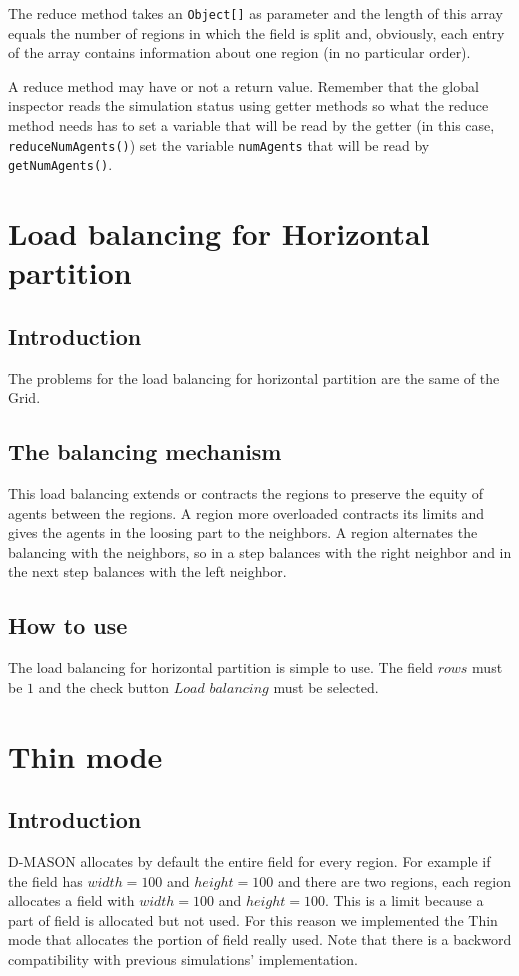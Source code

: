 \documentclass{article}
\begin{document}
The reduce method takes an \texttt{Object[]} as parameter and the length of this array equals the number of regions in which the field is split and, obviously, each entry of the array contains information about one region (in no particular order).

A reduce method may have or not a return value. Remember that the global inspector reads the simulation status using getter methods so what the reduce method needs has to set a variable that will be read by the getter (in this case, \texttt{reduceNumAgents()}) set the variable \texttt{numAgents} that will be read by \texttt{getNumAgents()}.





\section{Load balancing for Horizontal partition}

\subsection{Introduction}
The problems for the load balancing for horizontal partition are the same of the
Grid.

\subsection{The balancing mechanism}
This load balancing extends or contracts the regions to preserve the equity of
agents between the regions. A region more overloaded contracts its limits and
gives the agents in the loosing part to the neighbors. A region alternates the balancing
with the neighbors, so in a step balances with the right neighbor and in the
next step balances with the left neighbor.

\subsection{How to use}
The load balancing for horizontal partition is simple to use. The field $rows$
must be $1$ and the check button $Load$ $balancing$ must be selected.

\section{Thin mode}

\subsection{Introduction}
D-MASON allocates by default the entire field for every region. For example if
the field has $width=100$ and $height=100$ and there are two regions, each
region allocates a field with $width=100$ and $height=100$. This is a limit
because a part of field is allocated but not used. For this reason we
implemented the Thin mode that allocates the portion of field really used. Note
that there is a backword compatibility with previous simulations' implementation.
\end{document}
